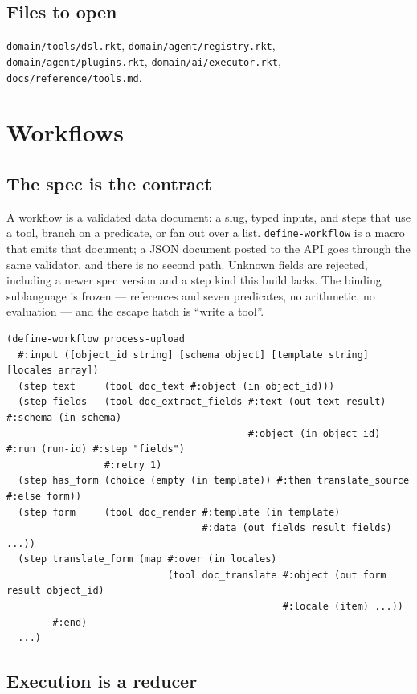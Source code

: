 \documentclass[11pt,a4paper]{report}
\gdef\currentchapterart{art/telemachus-head.png}
\newcommand{\chapterart}[1]{\gdef\currentchapterart{#1}}
\newcommand{\chapterart}[1]{}
\begin{document}
\section{Files to open}

\texttt{domain/tools/dsl.rkt}, \texttt{domain/agent/registry.rkt}, \texttt{domain/agent/plugins.rkt}, \texttt{domain/ai/executor.rkt}, \texttt{docs/reference/tools.md}.

\chapterart{art/ch-08-workflows.png}
\chapter{Workflows}

\section{The spec is the contract}

A workflow is a validated data document: a slug, typed inputs, and steps that use a tool, branch on a predicate, or fan out over a list. \texttt{define-workflow} is a macro that emits that document; a JSON document posted to the API goes through the same validator, and there is no second path. Unknown fields are rejected, including a newer spec version and a step kind this build lacks. The binding sublanguage is frozen --- references and seven predicates, no arithmetic, no evaluation --- and the escape hatch is ``write a tool''.

\begin{lstlisting}
(define-workflow process-upload
  #:input ([object_id string] [schema object] [template string] [locales array])
  (step text     (tool doc_text #:object (in object_id)))
  (step fields   (tool doc_extract_fields #:text (out text result) #:schema (in schema)
                                          #:object (in object_id) #:run (run-id) #:step "fields")
                 #:retry 1)
  (step has_form (choice (empty (in template)) #:then translate_source #:else form))
  (step form     (tool doc_render #:template (in template)
                                  #:data (out fields result fields) ...))
  (step translate_form (map #:over (in locales)
                            (tool doc_translate #:object (out form result object_id)
                                                #:locale (item) ...))
        #:end)
  ...)
\end{lstlisting}

\section{Execution is a reducer}
\end{document}
